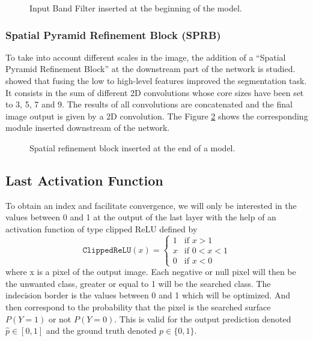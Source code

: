 \documentclass[../thesis.tex]{subfiles}
\begin{document}
	\begin{figure}[H]
		\centering
		
		\caption{ {Input} Band Filter inserted at the beginning of the model.}
		\label{fig:input-band-filter}
	\end{figure}
	
	\subsubsection{Spatial Pyramid Refinement Block (SPRB)} To take into account different scales in the image, the addition of a ``Spatial Pyramid Refinement Block'' at the downstream part of the network is studied. \cite{SPRBWei} showed that fusing the low to high-level features improved the segmentation task. It consists in the sum of different 2D convolutions whose core sizes have been set to 3, 5, 7 and 9. The results of all convolutions are concatenated and the final image output is given by a 2D convolution. The Figure \ref{fig:spatial-refinement-block} shows the corresponding module inserted downstream of the network.
	
	\begin{figure}[H]
		\centering
		
		\caption{ {Spatial} refinement block inserted at the end of a model.}
		\label{fig:spatial-refinement-block}
	\end{figure}

	\subsection{Last Activation Function}
	
	To obtain an index and facilitate convergence, we will only be interested in the values between 0 and 1 at the output of the last layer with the help of an activation function of type clipped ReLU defined by
	\begin{equation} \texttt{ClippedReLU}(x) =
	\begin{cases}
	\mbox{$1$} & \mbox{if } x > 1\\
	\mbox{$x$} & \mbox{if } 0<x<1\\
	\mbox{$0$} & \mbox{if } x < 0
	\end{cases}
	\end{equation}
	where x is a pixel of the output image. Each negative or null pixel will then be the unwanted class, greater or equal to 1 will be the searched class. The indecision border is the values between 0 and 1 which will be optimized. And then correspond to the probability that the pixel is the searched surface $P(Y=1)$ or not $P(Y=0)$. This is valid for the output prediction  {denoted} $\hat{p} \in [0,1]$ and the ground truth denoted $p \in \{0,1\}$.
	
\end{document}
